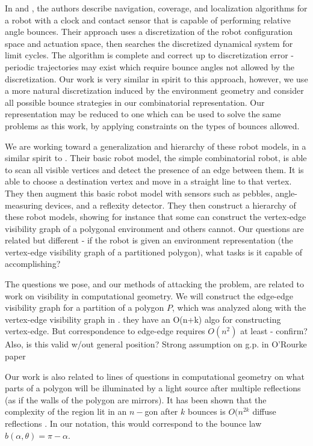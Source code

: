 \documentclass[]{styles/svproc}  %
\begin{document}
In \cite{alam2017minimalist} and \cite{alam2018space}, the authors describe
navigation, coverage, and localization algorithms for a robot with a clock and
contact sensor that is capable of performing relative angle bounces. Their
approach uses a discretization of the robot configuration space and actuation
space, then searches the discretized dynamical system for limit cycles. The
algorithm is complete and correct up to discretization error - periodic
trajectories may exist which require bounce angles not allowed by the
discretization. Our work is very similar in spirit to this approach, however, we
use a more natural discretization induced by the environment geometry and
consider all possible bounce strategies in our combinatorial representation. Our
representation may be reduced to one which can be used to solve the same
problems as this work, by applying constraints on the types of bounces allowed.

We are working toward a generalization and hierarchy of these robot models, in a
similar spirit to \cite{brunner2008simple}. Their basic robot model, the simple
combinatorial robot, is able to scan all visible vertices and detect the
presence of an edge between them. It is able to choose a destination vertex and
move in a straight line to that vertex. They then augment this basic robot model
with sensors such as pebbles, angle-measuring devices, and a reflexity detector.
They then construct a hierarchy of these robot models, showing for instance that
some can construct the vertex-edge visibility graph of a polygonal environment
and others cannot. Our questions are related but different - if the robot is
given an environment representation (the vertex-edge visibility graph of a
partitioned polygon), what tasks is it capable of accomplishing?

The questions we pose, and our methods of attacking the problem, are related to
work on visibility in computational geometry. We will construct the edge-edge 
visibility graph for a partition of a polygon $P$, which was analyzed along with
the vertex-edge visibility graph in \cite{rourke_viz}.
{\color{red} they have an
O(n+k) algo for constructing vertex-edge. But correspondence to edge-edge 
requires $O(n^2)$ at least - confirm? Also, is this valid w/out general position?
Strong assumption on g.p. in O'Rourke paper}

Our work is also related to lines of questions in computational geometry on what
parts of a polygon will be illuminated by a light source after multiple
reflections (as if the walls of the polygon are mirrors). It has been shown
that the complexity of the region lit in an $n-$gon after $k$ bounces is
$O(n^{2k}$ {\color{red} diffuse reflections} \cite{Aronov1996,prasad1998visibility}.
In our notation, this
would correspond to the bounce law $b(\alpha, \theta) = \pi - \alpha$.
\end{document}
